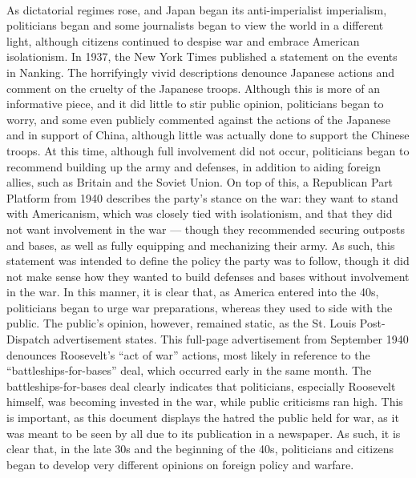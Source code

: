 \documentclass[12pt]{article}
\begin{document}
\paragraph{} As dictatorial regimes rose, and Japan began its anti-imperialist imperialism, politicians began and some journalists began to view the world in a different light, although citizens continued to despise war and embrace American isolationism. In 1937, the New York Times published a statement on the events in Nanking. The horrifyingly vivid descriptions denounce Japanese actions and comment on the cruelty of the Japanese troops. Although this is more of an informative piece, and it did little to stir public opinion, politicians began to worry, and some even publicly commented against the actions of the Japanese and in support of China, although little was actually done to support the Chinese troops. At this time, although full involvement did not occur, politicians began to recommend building up the army and defenses, in addition to aiding foreign allies, such as Britain and the Soviet Union. On top of this, a Republican Part Platform from 1940 describes the party's stance on the war: they want to stand with Americanism, which was closely tied with isolationism, and that they did not want involvement in the war — though they recommended securing outposts and bases, as well as fully equipping and mechanizing their army. As such, this statement was intended to define the policy the party was to follow, though it did not make sense how they wanted to build defenses and bases without involvement in the war. In this manner, it is clear that, as America entered into the 40s, politicians began to urge war preparations, whereas they used to side with the public. The public's opinion, however, remained static, as the St. Louis Post-Dispatch advertisement states. This full-page advertisement from September 1940 denounces Roosevelt's “act of war” actions, most likely in reference to the “battleships-for-bases” deal, which occurred early in the same month. The battleships-for-bases deal clearly indicates that politicians, especially Roosevelt himself, was becoming invested in the war, while public criticisms ran high. This is important, as this document displays the hatred the public held for war, as it was meant to be seen by all due to its publication in a newspaper. As such, it is clear that, in the late 30s and the beginning of the 40s, politicians and citizens began to develop very different opinions on foreign policy and warfare.
\end{document}
